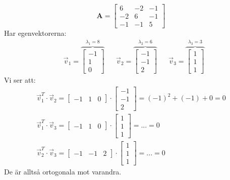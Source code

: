 \begin{Ex}
	\[
	\mathbf{A} =
	\begin{bmatrix}
		6 & -2 & -1\\
		-2 & 6 & -1\\
		-1 & -1 & 5
	\end{bmatrix}
	\]
	Har egenvektorerna:
	\begin{align*}
	& \vec{v}_1 = \overbrace{\begin{bmatrix} -1\\1\\0 \end{bmatrix}}^{\lambda_1 = 8}
	&& \vec{v}_2 = \overbrace{\begin{bmatrix} -1\\-1\\2 \end{bmatrix}}^{\lambda_2 = 6}
	&& \vec{v}_3 = \overbrace{\begin{bmatrix} 1\\1\\1 \end{bmatrix}}^{\lambda_3 = 3}
	\end{align*}
	Vi ser att:
	\begin{gather*}
		\vec{v}_1^T \cdot \vec{v}_2 =
		\begin{bmatrix} -1&1&0 \end{bmatrix} \cdot
		\begin{bmatrix} -1\\-1\\2 \end{bmatrix} = 
		(-1)^2 + (-1) + 0 = 0\\
		\vec{v}_1^T \cdot \vec{v}_3 =
		\begin{bmatrix} -1&1&0 \end{bmatrix} \cdot
		\begin{bmatrix} 1\\1\\1 \end{bmatrix} = ... = 0\\
		\vec{v}_2^T \cdot \vec{v}_3 = 
		\begin{bmatrix} -1&-1&2 \end{bmatrix} \cdot
		\begin{bmatrix} 1\\1\\1 \end{bmatrix} = ... = 0
	\end{gather*}
	De är alltså ortogonala mot varandra. 
\end{Ex}

